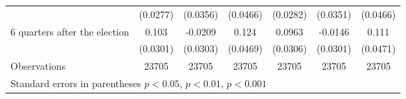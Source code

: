 \begin{table}[!ht]
\begin{tabular}{l*{6}{c}}
                    &    (0.0277)         &    (0.0356)         &    (0.0466)         &    (0.0282)         &    (0.0351)         &    (0.0466)         \\
[0.5em]
 6 quarters after the election&       0.103\sym{***}&     -0.0209         &       0.124\sym{**} &      0.0963\sym{**} &     -0.0146         &       0.111\sym{*}  \\
                    &    (0.0301)         &    (0.0303)         &    (0.0469)         &    (0.0306)         &    (0.0301)         &    (0.0471)         \\
\hline
Observations        &       23705         &       23705         &       23705         &       23705         &       23705         &       23705         \\
\hline\hline
\multicolumn{7}{l}{ Standard errors in parentheses \sym{*} \(p<0.05\), \sym{**} \(p<0.01\), \sym{***} \(p<0.001\)}\\
\end{tabular}
\end{table}
